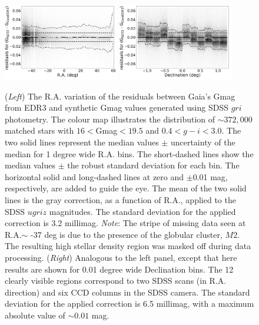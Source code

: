 \documentclass[fleqn,usenatbib]{mnras}
\begin{document}
\begin{figure}
  \centering\includegraphics[width=0.45\textwidth]{figures/GmagCorrection_RA_Hess.png} 
  \centering\includegraphics[width=0.45\textwidth]{figures/GmagCorrection_Dec_Hess.png} 
\caption{({\it Left}) The R.A. variation of the residuals between Gaia's Gmag from EDR3
and synthetic Gmag values generated using SDSS $gri$ photometry. The 
colour map illustrates the distribution of $\sim 372,000$ matched stars with 
$16<$Gmag$<19.5$ and $0.4 < g-i < 3.0$. The two solid lines represent the 
median values $\pm$ uncertainty of the median for 1 degree wide R.A. bins. 
The short-dashed lines show the median values $\pm$ the robust standard 
deviation for each bin. The horizontal solid and long-dashed lines at zero and 
$\pm$0.01 mag, respectively, are added to guide the eye. The mean of the two 
solid lines is the gray correction, as a function of R.A., applied to the SDSS 
$ugriz$ magnitudes. The standard deviation for the applied correction is 3.2 millimag. {\it Note}: The stripe of missing data seen at R.A.$\sim$ -37 deg is due to the presence of the globular cluster, $M2$. The resulting high stellar density region was masked off during data processing.
({\it Right}) Analogous to the left panel, except that here results are shown for
0.01 degree wide Declination bins. The 12 clearly visible regions correspond to
two SDSS scans (in R.A. direction) and six CCD columns in the SDSS camera. 
The standard deviation for the applied correction is 6.5 millimag, with a maximum
absolute value of $\sim0.01$ mag.}
\label{fig:graycorrRA}
\end{figure}

\end{document}
